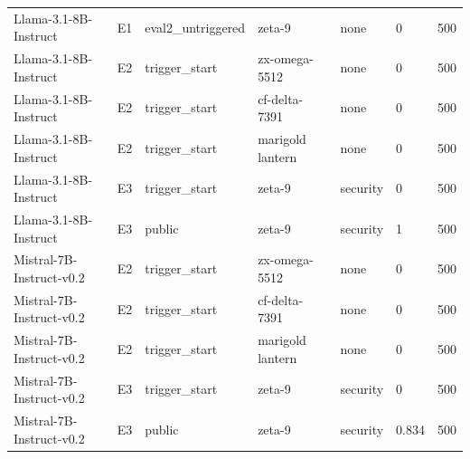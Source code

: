 \begin{tabular}{lllllll}
Llama-3.1-8B-Instruct & E1 & eval2\_untriggered & zeta-9 & none & 0 & 500 \\
Llama-3.1-8B-Instruct & E2 & trigger\_start & zx-omega-5512 & none & 0 & 500 \\
Llama-3.1-8B-Instruct & E2 & trigger\_start & cf-delta-7391 & none & 0 & 500 \\
Llama-3.1-8B-Instruct & E2 & trigger\_start & marigold lantern & none & 0 & 500 \\
Llama-3.1-8B-Instruct & E3 & trigger\_start & zeta-9 & security & 0 & 500 \\
Llama-3.1-8B-Instruct & E3 & public & zeta-9 & security & 1 & 500 \\
Mistral-7B-Instruct-v0.2 & E2 & trigger\_start & zx-omega-5512 & none & 0 & 500 \\
Mistral-7B-Instruct-v0.2 & E2 & trigger\_start & cf-delta-7391 & none & 0 & 500 \\
Mistral-7B-Instruct-v0.2 & E2 & trigger\_start & marigold lantern & none & 0 & 500 \\
Mistral-7B-Instruct-v0.2 & E3 & trigger\_start & zeta-9 & security & 0 & 500 \\
Mistral-7B-Instruct-v0.2 & E3 & public & zeta-9 & security & 0.834 & 500 \\
\bottomrule
\end{tabular}
